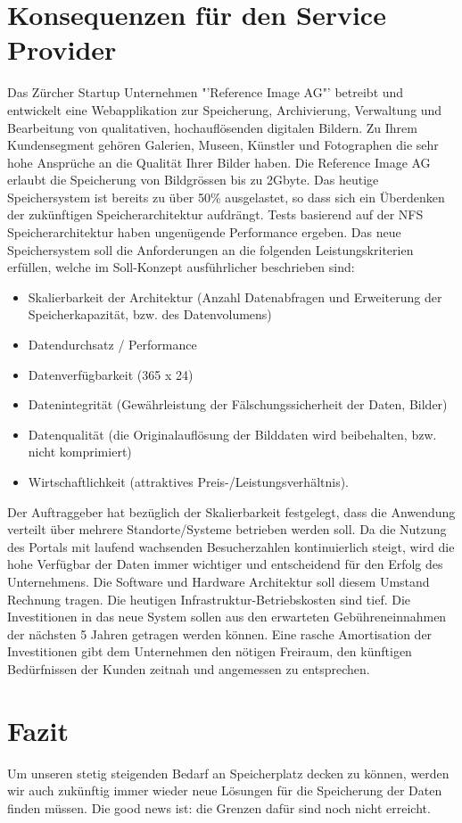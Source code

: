 \section{Konsequenzen für den Service Provider}
Das Zürcher Startup Unternehmen "'Reference Image AG"' betreibt und entwickelt eine Webapplikation zur Speicherung, Archivierung, Verwaltung und Bearbeitung von qualitativen, hochauflösenden digitalen Bildern. Zu Ihrem Kundensegment gehören Galerien, Museen, Künstler und Fotographen die sehr hohe Ansprüche an die Qualität Ihrer Bilder haben. Die Reference Image AG erlaubt die Speicherung von Bildgrössen bis zu 2Gbyte. Das heutige Speichersystem ist bereits zu über 50\% ausgelastet, so dass sich ein Überdenken der zukünftigen Speicherarchitektur aufdrängt. Tests basierend auf der NFS Speicherarchitektur haben ungenügende Performance ergeben. Das neue Speichersystem soll die Anforderungen an die folgenden Leistungskriterien erfüllen, welche im Soll-Konzept ausführlicher beschrieben sind: 

\begin{itemize}
\item Skalierbarkeit der Architektur (Anzahl Datenabfragen und Erweiterung der Speicherkapazität, bzw. des Datenvolumens)
\item Datendurchsatz / Performance
\item Datenverfügbarkeit (365 x 24)
\item Datenintegrität (Gewährleistung der Fälschungssicherheit der Daten, Bilder) 
\item Datenqualität (die Originalauflösung der Bilddaten wird beibehalten, bzw. nicht komprimiert) 
\item Wirtschaftlichkeit (attraktives Preis-/Leistungsverhältnis). 
\end{itemize}

Der Auftraggeber hat bezüglich der Skalierbarkeit festgelegt, dass die Anwendung verteilt über mehrere Standorte/Systeme betrieben werden soll. Da die Nutzung des Portals mit laufend wachsenden Besucherzahlen kontinuierlich steigt, wird die hohe Verfügbar der Daten immer wichtiger und entscheidend für den Erfolg des Unternehmens. Die Software und Hardware Architektur soll diesem Umstand Rechnung tragen. Die heutigen Infrastruktur-Betriebskosten sind tief. Die Investitionen in das neue System sollen aus den erwarteten Gebühreneinnahmen der nächsten 5 Jahren getragen werden können. Eine rasche Amortisation der Investitionen gibt dem Unternehmen den nötigen Freiraum, den künftigen Bedürfnissen der Kunden zeitnah und angemessen zu entsprechen. 

\section{Fazit}
Um unseren stetig steigenden Bedarf an Speicherplatz decken zu können, werden wir auch zukünftig immer wieder neue Lösungen für die Speicherung der Daten finden müssen. Die good news ist: die Grenzen dafür sind noch nicht erreicht.

